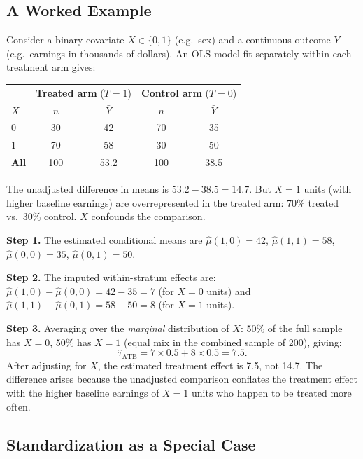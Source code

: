 \documentclass[master.tex]{subfiles}
\begin{document}
\subsection{A Worked Example}

Consider a binary covariate $X \in \{0,1\}$ (e.g.\ sex) and a
continuous outcome $Y$ (e.g.\ earnings in thousands of dollars).  An
OLS model fit separately within each treatment arm gives:

\medskip
\begin{center}
\renewcommand{\arraystretch}{1.3}
\begin{tabular}{lcccc}
\toprule
& \multicolumn{2}{c}{\textbf{Treated arm} ($T=1$)}
& \multicolumn{2}{c}{\textbf{Control arm} ($T=0$)} \\
$X$ & $n$ & $\bar{Y}$ & $n$ & $\bar{Y}$ \\
\midrule
$0$ & 30 & 42 & 70 & 35 \\
$1$ & 70 & 58 & 30 & 50 \\
\midrule
\textbf{All} & 100 & 53.2 & 100 & 38.5 \\
\bottomrule
\end{tabular}
\end{center}
\medskip

\noindent The unadjusted difference in means is
$53.2 - 38.5 = 14.7$.  But $X{=}1$ units (with higher baseline
earnings) are overrepresented in the treated arm: 70\% treated vs.\
30\% control.  $X$ confounds the comparison.

\medskip\noindent\textbf{Step 1.}  The estimated conditional means are
$\hat\mu(1, 0) = 42$, $\hat\mu(1, 1) = 58$, $\hat\mu(0, 0) = 35$,
$\hat\mu(0, 1) = 50$.

\medskip\noindent\textbf{Step 2.}  The imputed within-stratum effects
are: $\hat\mu(1,0) - \hat\mu(0,0) = 42 - 35 = 7$ (for $X{=}0$ units)
and $\hat\mu(1,1) - \hat\mu(0,1) = 58 - 50 = 8$ (for $X{=}1$ units).

\medskip\noindent\textbf{Step 3.}  Averaging over the \emph{marginal}
distribution of $X$: 50\% of the full sample has $X{=}0$, 50\% has
$X{=}1$ (equal mix in the combined sample of 200), giving:
\[
  \hat\tau_{\mathrm{ATE}}
  = 7 \times 0.5 + 8 \times 0.5 = 7.5.
\]
After adjusting for $X$, the estimated treatment effect is 7.5, not
14.7.  The difference arises because the unadjusted comparison
conflates the treatment effect with the higher baseline earnings of
$X{=}1$ units who happen to be treated more often.

\subsection{Standardization as a Special Case}
\label{w5:subsec:std}
\end{document}
